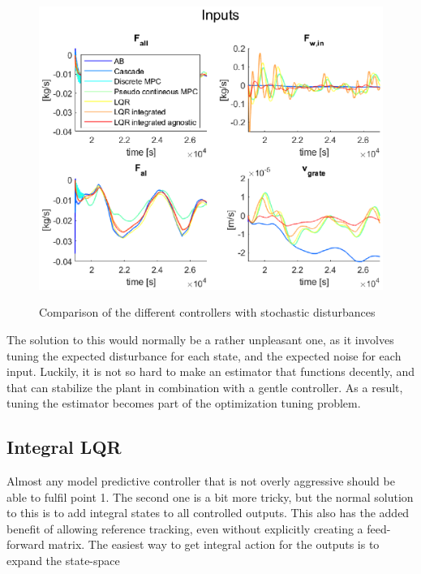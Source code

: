 \begin{figure}
    \includegraphics[width=\textwidth]{img/Fig_dump/outputs_ABCascadeDiscrete_MPCPseudo_contineous_MPCLQRLQR_integratedLQR_integrated_agnostic.eps}
    \label{fig:Assuming_controllers_outputs}
    \caption{Comparison of the different controllers with stochastic disturbances}
\end{figure}
\noindent
The solution to this would normally be a rather unpleasant one, as it involves tuning the expected disturbance for each state, and the expected noise for each input. Luckily, it is not so hard to make an estimator that functions decently, and that can stabilize the plant in combination with a gentle controller. As a result, tuning the estimator becomes part of the optimization tuning problem. 

\subsection{Integral LQR}
Almost any model predictive controller that is not overly aggressive should be able to fulfil point 1. The second one is a bit more tricky, but the normal solution to this is to add integral states to all controlled outputs. This also has the added benefit of allowing reference tracking, even without explicitly creating a feed-forward matrix. The easiest way to get integral action for the outputs is to expand the state-space

